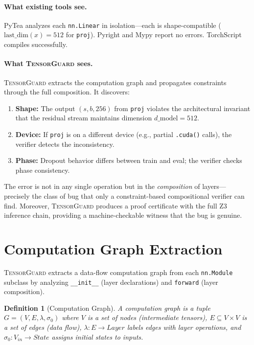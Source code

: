 \documentclass[11pt]{article}
\newtheorem{definition}[theorem]{Definition}
\begin{document}
\paragraph{What existing tools see.}
PyTea analyzes each \texttt{nn.Linear} in isolation---each is
shape-compatible ($\text{last\_dim}(x) = 512$ for \texttt{proj}).
Pyright and Mypy report no errors.  TorchScript compiles successfully.

\paragraph{What \textsc{TensorGuard} sees.}
\textsc{TensorGuard} extracts the computation graph and propagates
constraints through the full composition.  It discovers:
\begin{enumerate}[leftmargin=2em]
  \item \textbf{Shape:} The output $(s, b, 256)$ from \texttt{proj}
    violates the architectural invariant that the residual stream
    maintains dimension $d\_\text{model} = 512$.
  \item \textbf{Device:} If \texttt{proj} is on a different device
    (e.g., partial \texttt{.cuda()} calls), the verifier detects the
    inconsistency.
  \item \textbf{Phase:} Dropout behavior differs between train and
    eval; the verifier checks phase consistency.
\end{enumerate}
The error is not in any single operation but in the \emph{composition}
of layers---precisely the class of bug that only a constraint-based
compositional verifier can find.  Moreover, \textsc{TensorGuard}
produces a proof certificate with the full Z3 inference chain,
providing a machine-checkable witness that the bug is genuine.


\section{Computation Graph Extraction}\label{sec:extraction}

\textsc{TensorGuard} extracts a data-flow computation graph from each
\texttt{nn.Module} subclass by analyzing \texttt{\_\_init\_\_} (layer
declarations) and \texttt{forward} (layer composition).

\begin{definition}[Computation Graph]\label{def:compgraph}
A \emph{computation graph} is a tuple $G = (V, E, \lambda, \sigma_0)$
where $V$ is a set of nodes (intermediate tensors), $E \subseteq V \times V$
is a set of edges (data flow), $\lambda : E \to \mathit{Layer}$ labels
edges with layer operations, and $\sigma_0 : V_{\mathit{in}} \to
\mathit{State}$ assigns initial states to inputs.
\end{definition}
\end{document}
